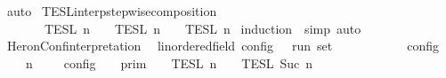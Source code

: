 \begin{isabellebody}
%
\isadelimproof
%
\endisadelimproof
%
\isatagproof
{}\isamarkupfalse%
\ auto%
\endisatagproof
{\isafoldproof}%
%
\isadelimproof
\isanewline
%
\endisadelimproof
\isanewline
{}\isamarkupfalse%
\ TESL{\isacharunderscore}interp{\isacharunderscore}stepwise{\isacharunderscore}composition{\isacharcolon}\isanewline
\ \ \ {\isacartoucheopen}{\isasymlbrakk}{\isasymlbrakk}\ {\isasymPhi}\ {\isacharat}\ {\isasymPhi}\ {\isasymrbrakk}{\isasymrbrakk}\isactrlsub T\isactrlsub E\isactrlsub S\isactrlsub L\isactrlbsup {\isasymge}\ n\isactrlesup \ {\isacharequal}\ {\isasymlbrakk}{\isasymlbrakk}\ {\isasymPhi}\ {\isasymrbrakk}{\isasymrbrakk}\isactrlsub T\isactrlsub E\isactrlsub S\isactrlsub L\isactrlbsup {\isasymge}\ n\isactrlesup \ {\isasyminter}\ {\isasymlbrakk}{\isasymlbrakk}\ {\isasymPhi}\ {\isasymrbrakk}{\isasymrbrakk}\isactrlsub T\isactrlsub E\isactrlsub S\isactrlsub L\isactrlbsup {\isasymge}\ n\isactrlesup {\isacartoucheclose}\isanewline
%
\isadelimproof
%
\endisadelimproof
%
\isatagproof
{}\isamarkupfalse%
\ {\isacharparenleft}induction\ {\isasymPhi}\ simp{\isacharcomma}\ auto{\isacharparenright}%
\endisatagproof
{\isafoldproof}%
%
\isadelimproof
%
\endisadelimproof
%
\isadelimdocument
%
\endisadelimdocument
%
\isatagdocument
%
\isamarkuptrue%
%
\endisatagdocument
{\isafolddocument}%
%
\isadelimdocument
%
\endisadelimdocument
{}\isamarkupfalse%
\ HeronConf{\isacharunderscore}interpretation\isanewline
\ \ {\isacharcolon}{\isacharcolon}{\isacartoucheopen}{\isacharprime}{\isasymtau}{\isacharcolon}{\isacharcolon}linordered{\isacharunderscore}field\ config\ {\isasymRightarrow}\ {\isacharprime}{\isasymtau}\ run\ set{\isacartoucheclose}\ \ \ \ \ \ \ \ \ \ {\isacharparenleft}{\isachardoublequoteopen}{\isasymlbrakk}\ {\isacharunderscore}\ {\isasymrbrakk}\isactrlsub c\isactrlsub o\isactrlsub n\isactrlsub f\isactrlsub i\isactrlsub g{\isachardoublequoteclose}\ {}{}{\isacharparenright}\isanewline
{}\isanewline
\ \ {\isacartoucheopen}{\isasymlbrakk}\ {\isasymGamma}{\isacharcomma}\ n\ {\isasymturnstile}\ {\isasymPsi}\ {\isasymtriangleright}\ {\isasymPhi}\ {\isasymrbrakk}\isactrlsub c\isactrlsub o\isactrlsub n\isactrlsub f\isactrlsub i\isactrlsub g\ {\isacharequal}\ {\isasymlbrakk}{\isasymlbrakk}\ {\isasymGamma}\ {\isasymrbrakk}{\isasymrbrakk}\isactrlsub p\isactrlsub r\isactrlsub i\isactrlsub m\ {\isasyminter}\ {\isasymlbrakk}{\isasymlbrakk}\ {\isasymPsi}\ {\isasymrbrakk}{\isasymrbrakk}\isactrlsub T\isactrlsub E\isactrlsub S\isactrlsub L\isactrlbsup {\isasymge}\ n\isactrlesup \ {\isasyminter}\ {\isasymlbrakk}{\isasymlbrakk}\ {\isasymPhi}\ {\isasymrbrakk}{\isasymrbrakk}\isactrlsub T\isactrlsub E\isactrlsub S\isactrlsub L\isactrlbsup {\isasymge}\ Suc\ n\isactrlesup {\isacartoucheclose}\isanewline

\end{isabellebody}
